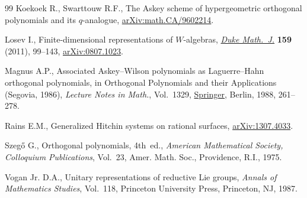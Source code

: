 \documentclass[pdftex]{sigma}
\theoremstyle{definition}
\numberwithin{equation}{section}
\begin{document}
\begin{thebibliography}{99}
Koekoek R., Swarttouw R.F., The {A}skey scheme of hypergeometric orthogonal
 polynomials and its $q$-analogue, \href{https://arxiv.org/abs/math.CA/9602214}{arXiv:math.CA/9602214}.

Losev I., Finite-dimensional representations of {$W$}-algebras, \href{https://doi.org/10.1215/00127094-1384800}{\textit{Duke
 Math.~J.}} \textbf{159} (2011), 99--143, \href{https://arxiv.org/abs/0807.1023}{arXiv:0807.1023}.

Magnus A.P., Associated {A}skey--{W}ilson polynomials as {L}aguerre--{H}ahn
 orthogonal polynomials, in Orthogonal Polynomials and their Applications
 ({S}egovia, 1986), \textit{Lecture Notes in Math.}, Vol.~1329, \href{https://doi.org/10.1007/BFb0083366}{Springer},
 Berlin, 1988, 261--278.

Rains E.M., Generalized {H}itchin systems on rational surfaces,
 \href{https://arxiv.org/abs/1307.4033}{arXiv:1307.4033}.

Szeg\H{o} G., Orthogonal polynomials, 4th~ed., \textit{American Mathematical Society,
 Colloquium Publications}, Vol.~23, Amer. Math. Soc., Providence,
 R.I., 1975.

Vogan Jr. D.A., Unitary representations of reductive {L}ie groups,
 \textit{Annals of Mathematics Studies}, Vol.~118, Princeton University Press,
 Princeton, NJ, 1987.

\end{thebibliography}\LastPageEnding
\end{document}
